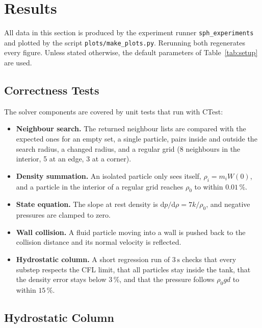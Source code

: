 \clearpage
\section{Results}
\label{sec:results}

All data in this section is produced by the experiment runner
\texttt{sph\_experiments} and plotted by the script
\texttt{plots/make\_plots.py}. Rerunning both regenerates every figure. Unless
stated otherwise, the default parameters of Table~\ref{tab:setup} are used.

\subsection{Correctness Tests}

The solver components are covered by unit tests that run with CTest:
\begin{itemize}
    \item \textbf{Neighbour search.} The returned neighbour lists are compared
          with the expected ones for an empty set, a single particle, pairs
          inside and outside the search radius, a changed radius, and a regular
          grid (8 neighbours in the interior, 5 at an edge, 3 at a corner).
    \item \textbf{Density summation.} An isolated particle only sees itself,
          $\rho_i = m_i W(0)$, and a particle in the interior of a regular
          grid reaches $\rho_0$ to within $0.01\,\%$.
    \item \textbf{State equation.} The slope at rest density is
          $\mathrm{d}p/\mathrm{d}\rho = 7k/\rho_0$, and negative pressures are
          clamped to zero.
    \item \textbf{Wall collision.} A fluid particle moving into a wall is
          pushed back to the collision distance and its normal velocity is
          reflected.
    \item \textbf{Hydrostatic column.} A short regression run of $3\,\mathrm{s}$
          checks that every substep respects the CFL limit, that all particles
          stay inside the tank, that the density error stays below $3\,\%$, and
          that the pressure follows $\rho_0 g d$ to within $15\,\%$.
\end{itemize}

\subsection{Hydrostatic Column}

